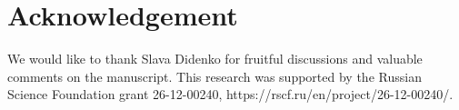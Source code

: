 \documentclass[12pt]{article}
\newcommand{\dr}{{{\rm d}}}
\begin{document}
\section*{Acknowledgement}
We would like to thank Slava Didenko for fruitful discussions and valuable comments on the manuscript. This research was supported by the Russian Science Foundation grant 26-12-00240, https://rscf.ru/en/project/26-12-00240/.


\end{document}
